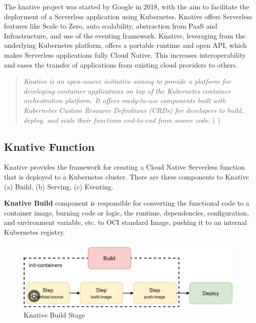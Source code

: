 \documentclass{article}
\begin{document}
\begin{flushleft}
The knative project was started by Google in 2018, with the aim to facilitate the deployment of a Serverless application using Kubernetes. Knative offers Serverless features like Scale to Zero, auto scalability, abstraction from PaaS and Infrastructure, and use of the eventing framework.
Knative, leveraging from the underlying Kubernetes platform, offers a portable runtime and open API, which makes Serverless applications fully Cloud Native. This increases interoperability and eases the transfer of applications from existing cloud providers to others.
\begin{quote}
    \textit{Knative is an open-source initiative aiming to provide a platform for developing container applications on top of the Kubernetes container orchestration platform. It offers ready-to-use components built with Kubernetes Custom Resource Definitions (CRDs) for developers to build, deploy, and scale their functions end-to-end from source code.} ( \cite{lin2019mitigating} )
\end{quote}

\subsection{Knative Function}
Knative provides the framework for creating a Cloud Native Serverless function that is deployed to a Kubernetes cluster. There are three components to Knative (a) Build, (b) Serving, (c) Eventing.

\textbf{Knative Build} component is responsible for converting the functional code to a container image, burning code or logic, the runtime, dependencies, configuration, and environment variable, etc. to OCI standard Image, pushing it to an internal Kubernetes registry.
\begin{figure}[h]
    \centering
    \includegraphics[width=0.5\linewidth]{images/knative-build.png}
    \caption{Knative Build Stage}
    \label{Knative_build_stage}
\end{figure}


\end{flushleft}
\end{document}

